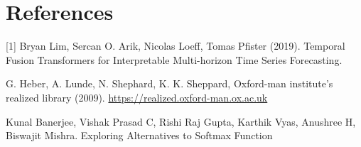 \documentclass[tablecaption=bottom,nowcp]{jmlr}%
\begin{document}
\section{References}
\label{sec:ref}
[1] Bryan Lim, Sercan O. Arik, Nicolas Loeff, Tomas Pfister (2019). Temporal Fusion Transformers for Interpretable Multi-horizon Time Series Forecasting.\par
\noindent
[2] G. Heber, A. Lunde, N. Shephard, K. K. Sheppard, Oxford-man institute’s realized library (2009). \url{https://realized.oxford-man.ox.ac.uk}\par
\noindent
[3] Kunal Banerjee, Vishak Prasad C, Rishi Raj Gupta, Karthik Vyas, Anushree H, Biswajit Mishra. Exploring Alternatives to Softmax Function\par
\end{document}
